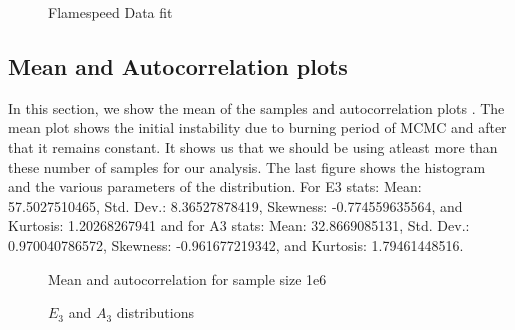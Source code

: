  \begin{figure}[H]
  \ContinuedFloat
  \caption{Flamespeed Data fit}
\end{figure}



\subsection{Mean and Autocorrelation plots}

In this section, we show the mean of the samples and autocorrelation plots . The mean plot shows the initial instability due to burning period of MCMC and after that it remains constant. It shows us that we should be using atleast more than these number of samples for our analysis. The last figure shows the histogram and the various parameters of the distribution. For E3 stats: Mean:  57.5027510465, Std. Dev.:  8.36527878419, Skewness:  -0.774559635564, and Kurtosis:  1.20268267941 and for A3 stats: Mean:  32.8669085131, Std. Dev.:  0.970040786572, Skewness:  -0.961677219342, and Kurtosis:  1.79461448516.

 \begin{figure}[H]
            \caption{Mean and autocorrelation for sample size 1e6}
\end{figure}

 \begin{figure}[H]      
            \caption{$E_3$ and $A_3$ distributions}
\end{figure}
